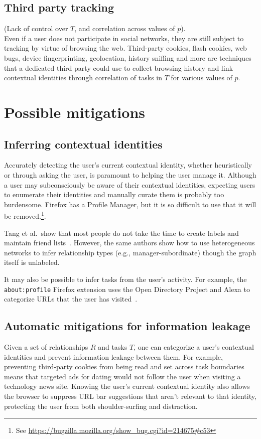 \documentclass{llncs}
\begin{document}
\subsection{Third party tracking}
\label{sec:tracking}
(Lack of control over $T$, and correlation across values of $p$).\\
Even if a user does not participate in social networks, they are still subject
to tracking by virtue of browsing the web. Third-party cookies, flash cookies,
web bugs, device fingerprinting, geolocation, history sniffing and more are
techniques that a dedicated third party could use to collect browsing history
and link contextual identities through correlation of tasks in $T$ for various
values of $p$.

\section{Possible mitigations}

\subsection{Inferring contextual identities}
Accurately detecting the user's current contextual identity, whether
heuristically or through asking the user, is paramount to helping the user
manage it.
Although a user may subconsciously be aware of their contextual identities,
expecting users to enumerate their identities and manually curate them is
probably too burdensome. Firefox has a Profile Manager, but it is so difficult to use that it will be removed.\footnote{See \url{https://bugzilla.mozilla.org/show\_bug.cgi?id=214675\#c53}}.

Tang et al.~show that most people do not take the time to create labels and
maintain friend lists~\cite{tang}. However, the same authors show how to use
heterogeneous networks to infer relationship types (e.g., manager-subordinate)
though the graph itself is unlabeled.

It may also be possible to infer tasks from the user's activity. For example,
the \texttt{about:profile} Firefox extension uses the Open Directory Project
and Alexa to categorize URLs that the user has visited~\cite{aboutprofile}.

\subsection{Automatic mitigations for information leakage}
Given a set of relationships $R$ and tasks $T$, one can categorize a user's
contextual identities and prevent information leakage between them.  For
example, preventing third-party cookies from being read and set across task
boundaries means that targeted ads for dating would not follow the user when
visiting a technology news site. Knowing the user's current contextual identity
also allows the browser to suppress URL bar suggestions that aren't relevant to
that identity, protecting the user from both shoulder-surfing and distraction.
\end{document}
